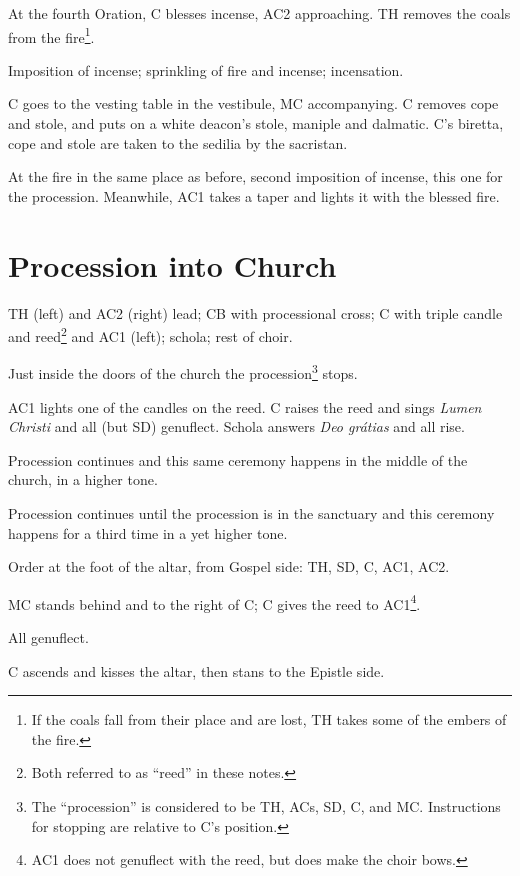 {\rubric At the fourth Oration, C blesses incense, AC2 approaching. TH removes
the coals from the fire\footnote{If the coals fall from their place and are
lost, TH takes some of the embers of the fire.}.

\rubric Imposition of incense; sprinkling of fire and incense; incensation.

\rubric C goes to the vesting table in the vestibule, MC accompanying. C
removes cope and stole, and puts on a white deacon's stole, maniple and
dalmatic. C's biretta, cope and stole are taken to the sedilia by the
sacristan.

\rubric At the fire in the same place as before, second imposition of incense,
this one for the procession. Meanwhile, AC1 takes a taper and lights it with
the blessed fire.

\section{Procession into Church}

\rubric TH (left) and AC2 (right) lead; CB with processional cross; C with
triple candle and reed\footnote{Both referred to as ``reed'' in these notes.}
and AC1 (left); schola; rest of choir.

\rubric Just inside the doors of the church the procession\footnote{The
``procession'' is considered to be TH, ACs, SD, C, and MC. Instructions for
stopping are relative to C's position.} stops. 

\rubric AC1 lights one of the candles on the reed. C raises the reed and sings
\textit{Lumen Christi} and all (but SD) genuflect. Schola answers \textit{Deo
grátias} and all rise.

\rubric Procession continues and this same ceremony happens in the middle of
the church, in a higher tone.

\rubric Procession continues until the procession is in the sanctuary and this
ceremony happens for a third time in a yet higher tone.

\rubric Order at the foot of the altar, from Gospel side: TH, SD, C, AC1,
AC2.

\rubric MC stands behind and to the right of C; C gives the reed to
AC1\footnote{AC1 does not genuflect with the reed, but does make the choir
bows.}.

\rubric All genuflect.


\rubric C ascends and kisses the altar, then stans to the Epistle side.

}
